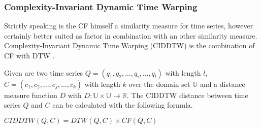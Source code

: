 \subsubsection{Complexity-Invariant Dynamic Time Warping} \label{complexity-invariant_dynamic_time_warping}
Strictly speaking is the CF himself a similarity measure for time series, however certainly better suited as factor in
combination with an other similarity measure. Complexity-Invariant Dynamic Time Warping (CIDDTW) is the combination of
CF with DTW \cite{batista2011complexity}.

Given are two time series $Q = (q_1, q_2, \dots, q_i, \dots, q_l)$ with length $l$,
$C = (c_1, c_2, \dots, c_j, \dots, c_k)$ with length $k$ over the domain set $\mathbb{U}$ and a distance measure
function $D$ with $D: \mathbb{U} \times \mathbb{U} \to \mathbb{R}$. The CIDDTW distance between time series $Q$ and $C$
can be calculated with the following formula.

\begin{center}
    $CIDDTW(Q, C) = DTW(Q, C) \times CF(Q, C)$
\end{center}
